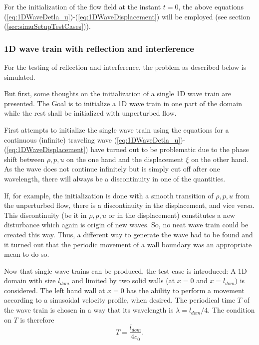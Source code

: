 \documentclass{report}
\begin{document}
For the initialization of the flow field at the instant $t=0$, the above equations (\ref{eq:1DWaveDetla_u})-(\ref{eq:1DWaveDisplacement}) will be employed (see section (\ref{sec:simuSetupTestCases})).


\subsubsection{1D wave train with reflection and interference}
\label{sec:GenIntro_1DWaveTrainReflect}
For the testing of reflection and interference, the problem as described below is simulated.

But first, some thoughts on the initialization of a single 1D wave train are presented.
The Goal is to initialize a 1D wave train in one part of the domain while the rest shall be initialized with unperturbed flow. %

First attempts to initialize the single wave train using the equations for a continuous (infinite) traveling wave (\ref{eq:1DWaveDetla_u})-(\ref{eq:1DWaveDisplacement}) have turned out to be problematic due to the phase shift between $\rho,p,u$ on the one hand and the displacement $\xi$ on the other hand. As the wave does not continue infinitely but is simply cut off after one wavelength, there will always be a discontinuity in one of the quantities.  

If, for example, the initialization is done with a smooth transition of $\rho,p,u$ from the unperturbed flow, there is a discontinuity in the displacement, and vice versa. This discontinuity (be it in $\rho,p,u$ or in the displacement) constitutes a new disturbance which again is origin of new waves. So, no neat wave train could be created this way. 
Thus, a different way to generate the wave had to be found and it turned out that the periodic movement of a wall boundary was an appropriate mean to do so. 

Now that single wave trains can be produced, the test case is introduced:
A 1D domain with size $l_{\mathit{dom}}$ and limited by two solid walls (at $x=0$ and $x=l_{\mathit{dom}}$) is considered. The left hand wall at $x=0$ has the ability to perform a movement according to a sinusoidal velocity profile, when desired.
The periodical time $T$ of the wave train is chosen in a way that its wavelength is
$\lambda=l_{\mathit{dom}}/4$. The condition on $T$ is therefore
\begin{equation}
 T=\frac{l_{\mathit{dom}}}{4 c_0}.
\end{equation}
\end{document}

